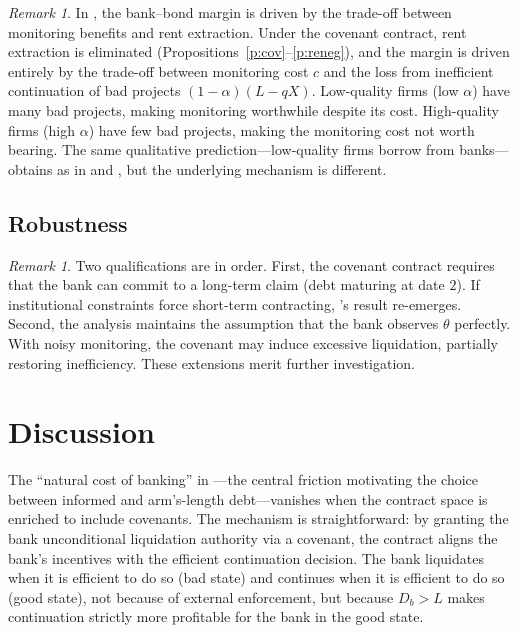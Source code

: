 \documentclass[12pt,a4paper]{article}
\theoremstyle{plain}
\theoremstyle{definition}
\theoremstyle{remark}
\newtheorem{remark}[theorem]{Remark}
\begin{document}
\begin{remark}\label{r:reinterpretation}
In \citet{rajan1992}, the bank--bond margin is driven by the trade-off between monitoring benefits and rent extraction. Under the covenant contract, rent extraction is eliminated (Propositions~\ref{p:cov}--\ref{p:reneg}), and the margin is driven entirely by the trade-off between monitoring cost $c$ and the loss from inefficient continuation of bad projects $(1-\alpha)(L - qX)$. Low-quality firms (low $\alpha$) have many bad projects, making monitoring worthwhile despite its cost. High-quality firms (high $\alpha$) have few bad projects, making the monitoring cost not worth bearing. The same qualitative prediction---low-quality firms borrow from banks---obtains as in \citet{rajan1992} and \citet{diamond1991}, but the underlying mechanism is different.
\end{remark}

\subsection{Robustness}

\begin{remark}\label{r:caveat}
Two qualifications are in order. First, the covenant contract requires that the bank can commit to a long-term claim (debt maturing at date $2$). If institutional constraints force short-term contracting, \citeauthor{rajan1992}'s result re-emerges. Second, the analysis maintains the assumption that the bank observes $\theta$ perfectly. With noisy monitoring, the covenant may induce excessive liquidation, partially restoring inefficiency. These extensions merit further investigation.
\end{remark}

\section{Discussion}

The ``natural cost of banking'' in \citet{rajan1992}---the central friction motivating the choice between informed and arm's-length debt---vanishes when the contract space is enriched to include covenants. The mechanism is straightforward: by granting the bank unconditional liquidation authority via a covenant, the contract aligns the bank's incentives with the efficient continuation decision. The bank liquidates when it is efficient to do so (bad state) and continues when it is efficient to do so (good state), not because of external enforcement, but because $D_b > L$ makes continuation strictly more profitable for the bank in the good state.
\end{document}
